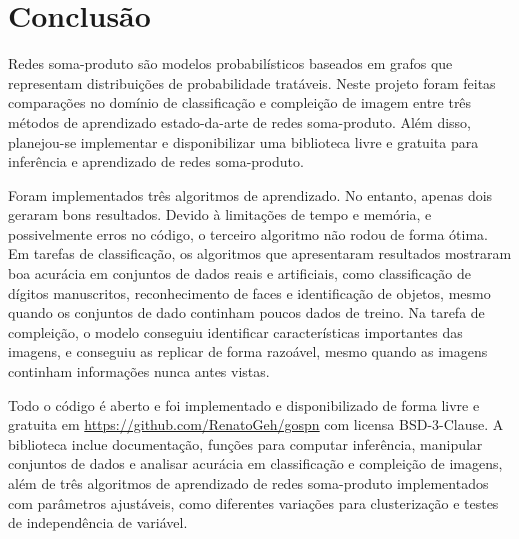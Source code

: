 \documentclass[12pt]{article}
\theoremstyle{plain}
\numberwithin{equation}{section}
\begin{document}
\section{Conclusão}

Redes soma-produto são modelos probabilísticos baseados em grafos que representam distribuições de
probabilidade tratáveis. Neste projeto foram feitas comparações no domínio de classificação e
compleição de imagem entre três métodos de aprendizado estado-da-arte de redes soma-produto. Além
disso, planejou-se implementar e disponibilizar uma biblioteca livre e gratuita para inferência e
aprendizado de redes soma-produto.

Foram implementados três algoritmos de aprendizado. No entanto, apenas dois geraram bons
resultados. Devido à limitações de tempo e memória, e possivelmente erros no código, o terceiro
algoritmo não rodou de forma ótima. Em tarefas de classificação, os algoritmos que apresentaram
resultados mostraram boa acurácia em conjuntos de dados reais e artificiais, como classificação de
dígitos manuscritos, reconhecimento de faces e identificação de objetos, mesmo quando os conjuntos
de dado continham poucos dados de treino. Na tarefa de compleição, o modelo conseguiu identificar
características importantes das imagens, e conseguiu as replicar de forma razoável, mesmo quando as
imagens continham informações nunca antes vistas.

Todo o código é aberto e foi implementado e disponibilizado de forma livre e gratuita em
\url{https://github.com/RenatoGeh/gospn} com licensa BSD-3-Clause. A biblioteca inclue
documentação, funções para computar inferência, manipular conjuntos de dados e analisar acurácia em
classificação e compleição de imagens, além de três algoritmos de aprendizado de redes soma-produto
implementados com parâmetros ajustáveis, como diferentes variações para clusterização e testes de
independência de variável.

\printbibliography[]
\end{document}
